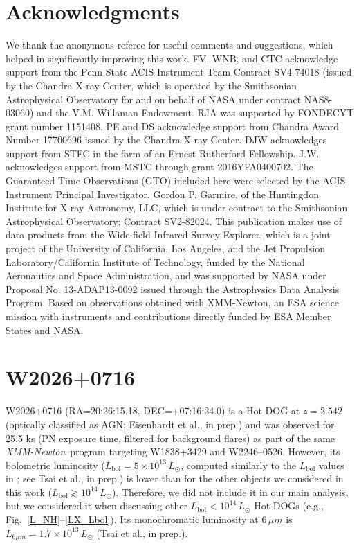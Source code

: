 \documentclass[useAMS,usenatbib]{mnras}
\newcommand*{\xmm}{\textit{\mbox{XMM-Newton}}}
\begin{document}
\section*{Acknowledgments} \vspace{0.2cm}
We thank the anonymous referee for useful comments and suggestions, which helped in significantly improving this work. FV, WNB, and CTC acknowledge support from the Penn State ACIS Instrument Team Contract SV4-74018 (issued by the Chandra X-ray Center, which is operated by the Smithsonian Astrophysical Observatory for and on behalf of NASA under contract NAS8-03060) and the V.M. Willaman Endowment. RJA was supported by FONDECYT grant number 1151408. PE and DS acknowledge support from Chandra Award Number 17700696 issued by the Chandra X-ray Center. DJW acknowledges support from STFC in the form of an Ernest Rutherford Fellowship. J.W. acknowledges support from MSTC through grant 2016YFA0400702. The Guaranteed Time Observations (GTO) included here were selected by the ACIS Instrument Principal Investigator, Gordon P. Garmire, of the Huntingdon Institute for X-ray Astronomy, LLC, which is under contract to the Smithsonian Astrophysical Observatory; Contract SV2-82024. This publication makes use of data products from the Wide-field Infrared Survey Explorer, which is a joint project of the University of California, Los Angeles, and the Jet Propulsion Laboratory/California Institute of Technology, funded by the National Aeronautics and Space Administration, and was supported by NASA under Proposal No. 13-ADAP13-0092 issued through the Astrophysics Data Analysis Program. Based on observations obtained with XMM-Newton, an ESA science mission with instruments and contributions directly funded by ESA  Member States and NASA.
\\


% 
% 
% 
 
% 

%

\appendix
\section{W2026+0716}\label{appendix}
W2026+0716 (RA=20:26:15.18, DEC=+07:16:24.0) is a Hot DOG at $z=2.542$ (optically classified as AGN; Eisenhardt et al., in prep.) and was observed for 25.5 ks (PN exposure time, filtered for background flares) as part of the same \xmm\, program targeting W1838+3429 and W2246--0526. However, its bolometric luminosity (\mbox{$L_{\mathrm{bol}}=5\times10^{13}\,L_\odot$}, computed  similarly to the $L_\mathrm{bol}$ values in \citealt{Tsai15}; see Tsai et al., in prep.) is lower than for the other objects we considered in this work ($L_{\mathrm{bol}}\gtrsim10^{14}\,L_\odot$). Therefore, we did not include it in our main analysis, but we considered it when discussing other $L_{\mathrm{bol}}<10^{14}\,L_\odot$ Hot DOGs (e.g., Fig.~\ref{L_NH}--\ref{LX_Lbol}). Its monochromatic luminosity at $6\,\mu m$ is $L_{6\mu m}=1.7\times10^{13}\,L_\odot$ (Tsai et al., in prep.).
\end{document}
